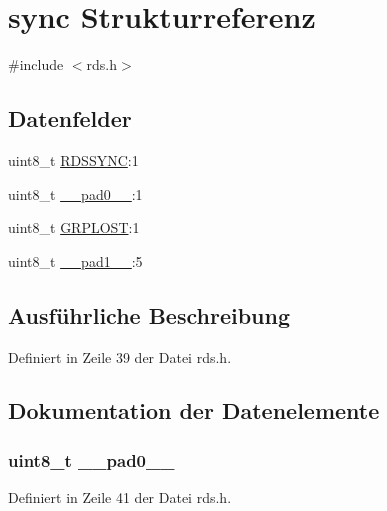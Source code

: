 \hypertarget{structsync}{}\section{sync Strukturreferenz}
\label{structsync}


{\ttfamily \#include $<$rds.\+h$>$}

\subsection*{Datenfelder}
\begin{DoxyCompactItemize}
\item 
uint8\+\_\+t \hyperlink{structsync_acdf4253982980384be3340fd9a9ab7c5}{R\+D\+S\+S\+Y\+N\+C}\+:1
\item 
uint8\+\_\+t \hyperlink{structsync_a8b4eebe79ded0459acec2f4950102ba3}{\+\_\+\+\_\+pad0\+\_\+\+\_\+}\+:1
\item 
uint8\+\_\+t \hyperlink{structsync_a430b332cff3a3786c4854defcd95d078}{G\+R\+P\+L\+O\+S\+T}\+:1
\item 
uint8\+\_\+t \hyperlink{structsync_a77f12d2e278bd5c07712648ac0df5e08}{\+\_\+\+\_\+pad1\+\_\+\+\_\+}\+:5
\end{DoxyCompactItemize}


\subsection{Ausführliche Beschreibung}


Definiert in Zeile 39 der Datei rds.\+h.



\subsection{Dokumentation der Datenelemente}
\hypertarget{structsync_a8b4eebe79ded0459acec2f4950102ba3}{}
\subsubsection[{\+\_\+\+\_\+pad0\+\_\+\+\_\+}]{\setlength{\rightskip}{0pt plus 5cm}uint8\+\_\+t \+\_\+\+\_\+pad0\+\_\+\+\_\+}\label{structsync_a8b4eebe79ded0459acec2f4950102ba3}


Definiert in Zeile 41 der Datei rds.\+h.

\hypertarget{structsync_a77f12d2e278bd5c07712648ac0df5e08}{}
